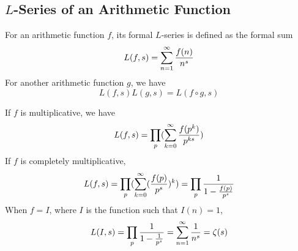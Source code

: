 \documentclass{article}
\begin{document}
\subsection{$L$-Series of an Arithmetic Function}
For an arithmetic function $f$, its formal $L$-series is defined as the formal sum
\begin{equation*}
  L(f, s) = \sum_{n=1}^\infty {f(n) \over n^s}
\end{equation*}
For another arithmetic function $g$, we have
\begin{equation*}
  L(f, s) L(g, s) = L(f \circ g, s)
\end{equation*}

If $f$ is multiplicative, we have
\begin{equation*}
  L(f, s) = \prod_p (\sum_{k=0}^\infty {f(p^k) \over p^{ks}})
\end{equation*}
If $f$ is completely multiplicative,
\begin{equation*}
  L(f, s)
  = \prod_p (\sum_{k=0}^\infty ({f(p) \over p^s})^k)
  = \prod_p {1 \over 1 - {f(p) \over p^s}}
\end{equation*}
When $f = I$, where $I$ is the function such that $I(n) = 1$,
\begin{equation*}
  L(I, s)
  = \prod_p {1 \over 1 - {1 \over p^s}}
  = \sum_{n=1}^\infty {1 \over n^s}
  = \zeta(s)
\end{equation*}
\end{document}
